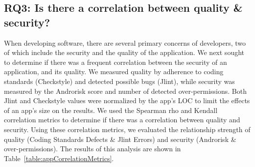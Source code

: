 \documentclass{llncs}
\newcommand{\dan}[1]{\textcolor{blue}{{\it [Dan says: #1]}}}
\begin{document}


\subsection{RQ3: Is there a correlation between quality \& security?}

When developing software, there are several primary concerns of developers, two of which include the security and the quality of the application. We next sought to determine if there was a frequent correlation between the security of an application, and its quality. We measured quality by adherence to coding standards (Checkstyle) and detected possible bugs (Jlint), while security was measured by the Androrisk score and number of detected over-permissions. Both Jlint and Checkstyle values were normalized by the app's LOC to limit the effects of an app's size on the results. We used the Spearman rho and Kendall correlation metrics to determine if there was a correlation between quality and security. Using these correlation metrics, we evaluated the relationship strength of quality (Coding Standards Defects \& Jlint Errors) and security (Androrisk \& over-permissions). The results of this analysis are shown in Table~\ref{table:appCorrelationMetrics}.


\end{document}
